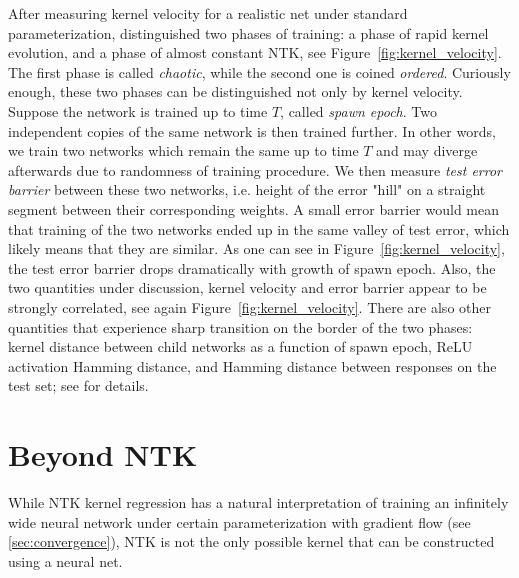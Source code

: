 \documentclass{article}
\begin{document}
    After measuring kernel velocity for a realistic net under standard parameterization, \cite{fort2020deep} distinguished two phases of training: a phase of rapid kernel evolution, and a phase of almost constant NTK, see Figure~\ref{fig:kernel_velocity}.
    The first phase is called \emph{chaotic}, while the second one is coined \emph{ordered}.
    Curiously enough, these two phases can be distinguished not only by kernel velocity.
    Suppose the network is trained up to time $T$, called \emph{spawn epoch}.
    Two independent copies of the same network is then trained further.
    In other words, we train two networks which remain the same up to time $T$ and may diverge afterwards due to randomness of training procedure.
    We then measure \emph{test error barrier} between these two networks, i.e. height of the error "hill" on a straight segment between their corresponding weights.
    A small error barrier would mean that training of the two networks ended up in the same valley of test error, which likely means that they are similar.
    As one can see in Figure~\ref{fig:kernel_velocity}, the test error barrier drops dramatically with growth of spawn epoch.
    Also, the two quantities under discussion, kernel velocity and error barrier appear to be strongly correlated, see again Figure~\ref{fig:kernel_velocity}.
    There are also other quantities that experience sharp transition on the border of the two phases: kernel distance between child networks as a function of spawn epoch, ReLU activation Hamming distance, and Hamming distance between responses on the test set; see \cite{fort2020deep} for details.


    \section{Beyond NTK}
    \label{sec:beyond}


    While NTK kernel regression has a natural interpretation of training an infinitely wide neural network under certain parameterization with gradient flow (see \cref{sec:convergence}), NTK is not the only possible kernel that can be constructed using a neural net.
\end{document}

